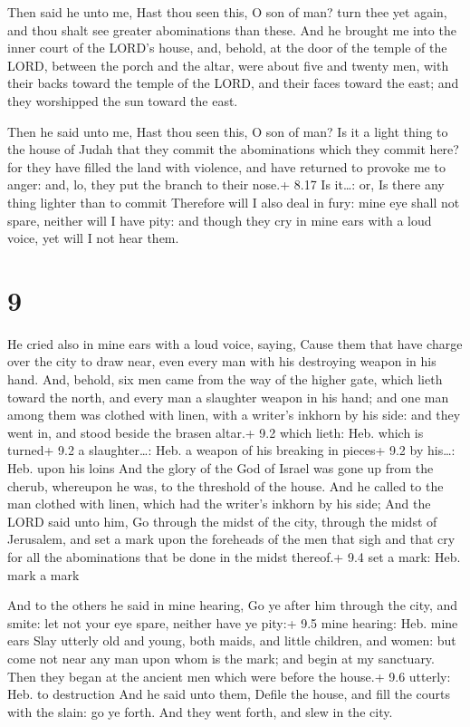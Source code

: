  Then said he unto me, Hast thou seen this, O son of man?
turn thee yet again, and thou shalt see greater abominations than these.
 And he brought me into the inner court of the LORD's
house, and, behold, at the door of the temple of the LORD, between the
porch and the altar, were about five and twenty men, with their backs
toward the temple of the LORD, and their faces toward the east; and they
worshipped the sun toward the east.

 Then he said unto me, Hast thou seen this, O son of man?
Is it a light thing to the house of Judah that they commit the
abominations which they commit here? for they have filled the land with
violence, and have returned to provoke me to anger: and, lo, they put
the branch to their nose.+ 8.17 Is it\ldots: or, Is there any thing
lighter than to commit  Therefore will I also deal in fury:
mine eye shall not spare, neither will I have pity: and though they cry
in mine ears with a loud voice, yet will I not hear them.

\hypertarget{section-8}{%
\section{9}\label{section-8}}

 He cried also in mine ears with a loud voice, saying, Cause
them that have charge over the city to draw near, even every man with
his destroying weapon in his hand.  And, behold, six men
came from the way of the higher gate, which lieth toward the north, and
every man a slaughter weapon in his hand; and one man among them was
clothed with linen, with a writer's inkhorn by his side: and they went
in, and stood beside the brasen altar.+ 9.2 which lieth: Heb. which is
turned+ 9.2 a slaughter\ldots: Heb. a weapon of his breaking in pieces+
9.2 by his\ldots: Heb. upon his loins  And the glory of the
God of Israel was gone up from the cherub, whereupon he was, to the
threshold of the house. And he called to the man clothed with linen,
which had the writer's inkhorn by his side;  And the LORD
said unto him, Go through the midst of the city, through the midst of
Jerusalem, and set a mark upon the foreheads of the men that sigh and
that cry for all the abominations that be done in the midst thereof.+
9.4 set a mark: Heb. mark a mark

 And to the others he said in mine hearing, Go ye after
him through the city, and smite: let not your eye spare, neither have ye
pity:+ 9.5 mine hearing: Heb. mine ears  Slay utterly old
and young, both maids, and little children, and women: but come not near
any man upon whom is the mark; and begin at my sanctuary. Then they
began at the ancient men which were before the house.+ 9.6 utterly: Heb.
to destruction  And he said unto them, Defile the house, and
fill the courts with the slain: go ye forth. And they went forth, and
slew in the city.

